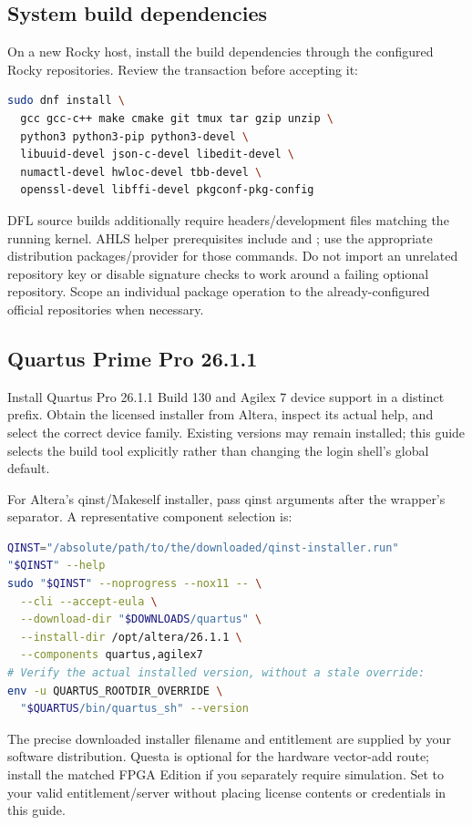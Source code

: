 \documentclass[11pt,letterpaper]{article}
\newcommand{\code}[1]{{\ttfamily\expandafter\seqsplit\expandafter{\detokenize{#1}}}}
\newcommand{\src}[1]{\cite{S#1}}
\begin{document}
\subsection{System build dependencies}
On a new Rocky host, install the build dependencies through the configured
Rocky repositories. Review the transaction before accepting it:
\begin{lstlisting}[language=bash]
sudo dnf install \
  gcc gcc-c++ make cmake git tmux tar gzip unzip \
  python3 python3-pip python3-devel \
  libuuid-devel json-c-devel libedit-devel \
  numactl-devel hwloc-devel tbb-devel \
  openssl-devel libffi-devel pkgconf-pkg-config
\end{lstlisting}
DFL source builds additionally require headers/development files matching the
running kernel. AHLS helper prerequisites include \code{rpm2cpio} and
\code{uidmap}; use the appropriate distribution packages/provider for those
commands.\src{2}
Do not import an unrelated repository key or disable signature checks to work
around a failing optional repository. Scope an individual package operation to
the already-configured official repositories when necessary.

\subsection{Quartus Prime Pro 26.1.1}
Install Quartus Pro 26.1.1 Build 130 and Agilex 7 device support in a distinct
prefix. Obtain the licensed installer from Altera, inspect its actual help,
and select the correct device family. Existing versions may remain installed;
this guide selects the build tool explicitly rather than changing the login
shell's global default.\src{20}

For Altera's qinst/Makeself installer, pass qinst arguments after the wrapper's
\code{--} separator. A representative component selection is:
\begin{lstlisting}[language=bash]
QINST="/absolute/path/to/the/downloaded/qinst-installer.run"
"$QINST" --help
sudo "$QINST" --noprogress --nox11 -- \
  --cli --accept-eula \
  --download-dir "$DOWNLOADS/quartus" \
  --install-dir /opt/altera/26.1.1 \
  --components quartus,agilex7
# Verify the actual installed version, without a stale override:
env -u QUARTUS_ROOTDIR_OVERRIDE \
  "$QUARTUS/bin/quartus_sh" --version
\end{lstlisting}
The precise downloaded installer filename and entitlement are supplied by your
software distribution. Questa is optional for the hardware vector-add route;
install the matched FPGA Edition if you separately require simulation. Set
\code{LM_LICENSE_FILE} to your valid entitlement/server without placing license
contents or credentials in this guide.
\end{document}
